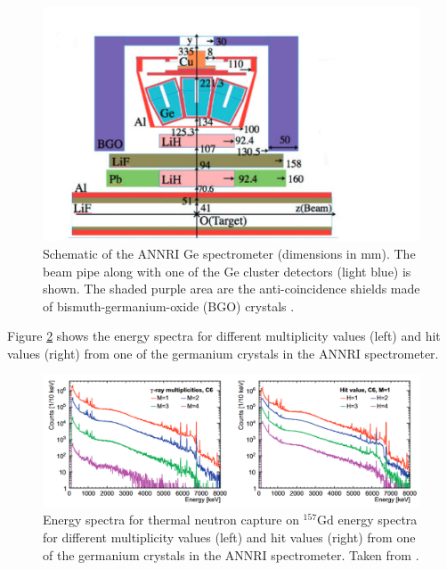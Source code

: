 \begin{figure}

        \includegraphics[width=\textwidth]{Figures/annrigd.png}
        \caption{Schematic of the ANNRI Ge spectrometer (dimensions in mm). The beam pipe along with one of the Ge cluster detectors (light blue) is shown. The shaded purple area are the anti-coincidence shields made of bismuth-germanium-oxide (BGO) crystals \cite{annri_gd_energy}.}
        \label{fig:annrigd}
    
\end{figure}

Figure \ref{fig:annrigdenergyspectra} shows the energy spectra for different multiplicity values (left) and hit values (right) from one of the germanium crystals in the ANNRI spectrometer. 

\begin{figure}
\includegraphics[width=\textwidth]{Figures/annrigdenergyspectra.png}
\caption{Energy spectra for thermal neutron capture on ${ }^{157} \mathrm{Gd}$ energy spectra for different multiplicity values (left) and hit values (right) from one of the germanium crystals in the ANNRI spectrometer. Taken from \cite{annri_gd_energy}.}
\label{fig:annrigdenergyspectra}
\end{figure}

